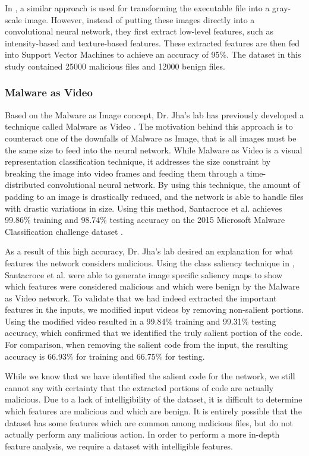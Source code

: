 \documentclass[12pt, letterpaper, titlepage]{article}
\begin{document}
In \cite{Kancherla}, a similar approach is used for transforming the executable file into a gray-scale image.
However, instead of putting these images directly into a convolutional neural network, they first extract low-level features, such as intensity-based and texture-based features.
These extracted features are then fed into Support Vector Machines to achieve an accuracy of 95\%.
The dataset in this study contained 25000 malicious files and 12000 benign files.

\subsubsection{Malware as Video}
Based on the Malware as Image concept, Dr. Jha's lab has previously developed a technique called Malware as Video \cite{SantacroceMaV}.
The motivation behind this approach is to counteract one of the downfalls of Malware as Image, that is all images must be the same size to feed into the neural network.
While Malware as Video is a visual representation classification technique, it addresses the size constraint by breaking the image into video frames and feeding them through a time-distributed convolutional neural network.
By using this technique, the amount of padding to an image is drastically reduced, and the network is able to handle files with drastic variations in size.
Using this method, Santacroce et al. \cite{SantacroceMaV} achieves 99.86\% training and 98.74\% testing accuracy on the 2015 Microsoft Malware Classification challenge dataset \cite{Ronen2018}.

As a result of this high accuracy, Dr. Jha's lab desired an explanation for what features the network considers malicious.
Using the class saliency technique in \cite{Simonyan2013}, Santacroce et al. \cite{SantacroceSalience} were able to generate image specific saliency maps to show which features were considered malicious and which were benign by the Malware as Video network.
To validate that we had indeed extracted the important features in the inputs, we modified input videos by removing non-salient portions.
Using the modified video resulted in a 99.84\% training and 99.31\% testing accuracy, which confirmed that we identified the truly salient portion of the code.
For comparison, when removing the salient code from the input, the resulting accuracy is 66.93\% for training and 66.75\% for testing.

While we know that we have identified the salient code for the network, we still cannot say with certainty that the extracted portions of code are actually malicious.
Due to a lack of intelligibility of the dataset, it is difficult to determine which features are malicious and which are benign.
It is entirely possible that the dataset has some features which are common among malicious files, but do not actually perform any malicious action.
In order to perform a more in-depth feature analysis, we require a dataset with intelligible features.
\end{document}
